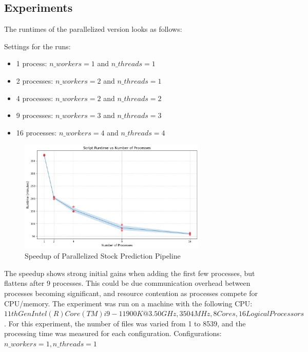\documentclass[11pt,a4paper]{article}
\begin{document}
\subsection{Experiments}
The runtimes of the parallelized version looks as follows:

Settings for the runs:
\begin{itemize}
    \item 1 process: $n\_workers = 1$ and $n\_threads = 1$
    \item 2 processes: $n\_workers = 2$ and $n\_threads = 1$
    \item 4 processes: $n\_workers = 2$ and $n\_threads = 2$
    \item 9 processes: $n\_workers = 3$ and $n\_threads = 3$
    \item 16 processes: $n\_workers = 4$ and $n\_threads = 4$
    
\end{itemize}

\begin{figure}[H]
    \centering
    \includegraphics[width=0.8\textwidth]{runtime.png}
    \caption{Speedup of Parallelized Stock Prediction Pipeline}
\end{figure}

The speedup shows strong initial gains when adding the first few processes, but flattens after 9 processes. This could be due communication overhead between processes becoming significant, and resource contention as processes compete for CPU/memory.
The experiment was run on a machine with the following CPU:\newline
$11th Gen Intel(R) Core(TM) i9-11900K @ 3.50GHz, 3504 MHz, 8 Cores, 16 Logical Processors$.
\newline \newline
For this experiment, the number of files was varied from 1 to 8539, and the processing time was measured for each configuration.
Configurations: $n\_workers = 1, n\_threads = 1$
\end{document}
